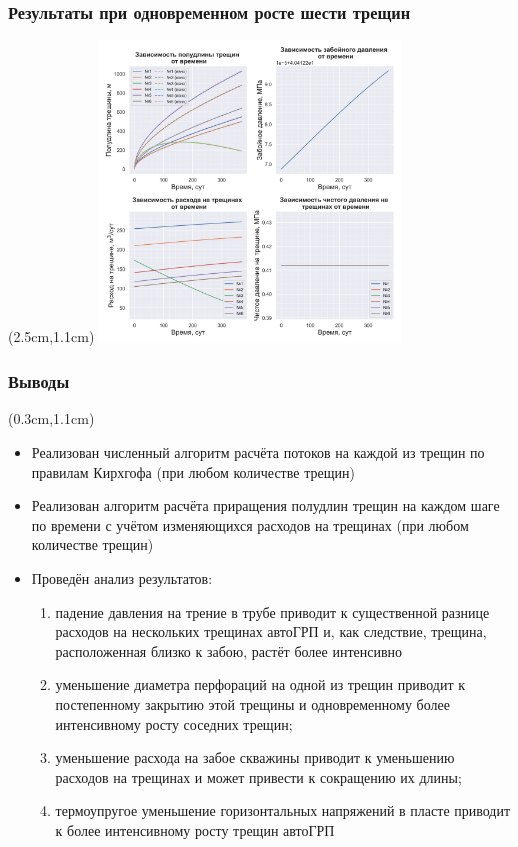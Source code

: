 \documentclass{beamer}
\begin{document}
\begin{frame}
\frametitle{Результаты при одновременном росте шести трещин}

\begin{textblock*}{8cm}(2.5cm,1.1cm)
\includegraphics[width=8cm]{myimage13.jpg}
\end{textblock*}

\end{frame}


\begin{frame}
\frametitle{Выводы}

\small
\begin{textblock*}{12cm}(0.3cm,1.1cm)
\begin{itemize}
	\item Реализован численный алгоритм расчёта потоков на каждой из трещин по правилам Кирхгофа (при любом количестве трещин)
	\item Реализован алгоритм расчёта приращения полудлин трещин на каждом шаге по времени с учётом изменяющихся расходов на трещинах (при любом количестве трещин)
	\item Проведён анализ результатов:
	\begin{enumerate}[\large\textbf{--}]
	\item падение давления на трение в трубе приводит к существенной разнице расходов на нескольких трещинах автоГРП и, как следствие, трещина, расположенная близко к забою, растёт более интенсивно 
	\item уменьшение диаметра перфораций на одной из трещин приводит к постепенному закрытию этой трещины и одновременному более интенсивному росту соседних трещин;
	\item уменьшение расхода на забое скважины приводит к уменьшению расходов на трещинах и может привести к сокращению их длины;
	\item термоупругое уменьшение горизонтальных напряжений в пласте приводит к более интенсивному росту трещин автоГРП
	\end{enumerate}
\end{itemize}
\end{textblock*}

\normalsize

\end{frame}
\end{document}
